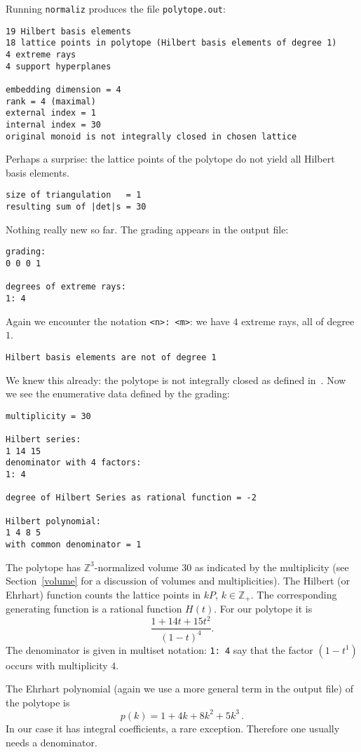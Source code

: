 \documentclass[12pt,a4paper]{scrartcl}
\theoremstyle{definition}
\def\ZZ{{\mathbb Z}}
\def\ttt{\texttt}
\begin{document}
Running \ttt{normaliz} produces the file \ttt{polytope.out}:
\begin{Verbatim}
19 Hilbert basis elements
18 lattice points in polytope (Hilbert basis elements of degree 1)
4 extreme rays
4 support hyperplanes

embedding dimension = 4
rank = 4 (maximal)
external index = 1
internal index = 30
original monoid is not integrally closed in chosen lattice
\end{Verbatim}
Perhaps a surprise: the lattice points of the polytope do not yield all Hilbert basis elements.
\begin{Verbatim}
size of triangulation   = 1
resulting sum of |det|s = 30
\end{Verbatim}
Nothing really new so far. The grading appears in the output file:
\begin{Verbatim}
grading:
0 0 0 1 

degrees of extreme rays:
1: 4
\end{Verbatim}
Again we encounter the notation \verb|<n>: <m>|: we have $4$ extreme rays, all of degree $1$.
\begin{Verbatim}
Hilbert basis elements are not of degree 1
\end{Verbatim}
We knew this already: the polytope is not integrally closed as defined in~\cite{BG}. Now we see the enumerative data defined by the grading:
\begin{Verbatim}
multiplicity = 30

Hilbert series:
1 14 15 
denominator with 4 factors:
1: 4  

degree of Hilbert Series as rational function = -2

Hilbert polynomial:
1 4 8 5 
with common denominator = 1
\end{Verbatim}
The polytope has $\ZZ^3$-normalized volume $30$ as indicated by the multiplicity (see Section~\ref{volume} for a discussion of volumes and multiplicities). The Hilbert (or Ehrhart) function counts the lattice points in $kP$, $k\in\ZZ_+$. The corresponding generating function is a
rational function $H(t)$. For our polytope it is
$$
\frac{1+14t+15t^2}{(1-t)^4}.
$$
The denominator is given in multiset notation: \verb|1: 4| say that the factor $(1-t^1)$ occurs with multiplicity $4$.

The Ehrhart polynomial (again we use a more general term in
the output file) of the polytope is
$$
p(k)=1+4k+8k^2+5k^3\,.
$$
In our case it has integral coefficients, a rare exception. Therefore one usually needs a denominator.
\end{document}
